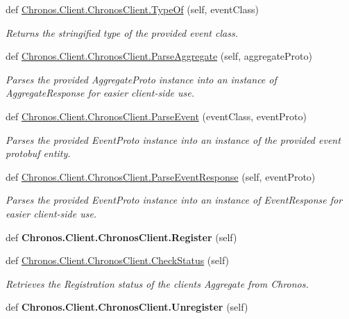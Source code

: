 \begin{DoxyCompactItemize}
\item 
def \hyperlink{group__Chronos_gae5a664ef1c7bf294b17376794264699f}{Chronos.\+Client.\+Chronos\+Client.\+Type\+Of} (self, event\+Class)
\begin{DoxyCompactList}\small\item\em Returns the stringified type of the provided event class. \end{DoxyCompactList}\item 
def \hyperlink{group__Chronos_ga73356a0cabbb65e5ee84927e98e66b18}{Chronos.\+Client.\+Chronos\+Client.\+Parse\+Aggregate} (self, aggregate\+Proto)
\begin{DoxyCompactList}\small\item\em Parses the provided Aggregate\+Proto instance into an instance of Aggregate\+Response for easier client-\/side use. \end{DoxyCompactList}\item 
def \hyperlink{group__Chronos_gafdce0107a1a368f4f4f7e7c9b084fc0c}{Chronos.\+Client.\+Chronos\+Client.\+Parse\+Event} (event\+Class, event\+Proto)
\begin{DoxyCompactList}\small\item\em Parses the provided Event\+Proto instance into an instance of the provided event protobuf entity. \end{DoxyCompactList}\item 
def \hyperlink{group__Chronos_gade70bdac06e41607144ef2a0fb7a3e36}{Chronos.\+Client.\+Chronos\+Client.\+Parse\+Event\+Response} (self, event\+Proto)
\begin{DoxyCompactList}\small\item\em Parses the provided Event\+Proto instance into an instance of Event\+Response for easier client-\/side use. \end{DoxyCompactList}\item 
def {\bfseries Chronos.\+Client.\+Chronos\+Client.\+Register} (self)\hypertarget{group__Chronos_ga095a52584dd2cd474d268ae5e8c8df20}{}\label{group__Chronos_ga095a52584dd2cd474d268ae5e8c8df20}

\item 
def \hyperlink{group__Chronos_ga6cae4fd381b0282b2aa5820b3d0f6266}{Chronos.\+Client.\+Chronos\+Client.\+Check\+Status} (self)
\begin{DoxyCompactList}\small\item\em Retrieves the Registration status of the client\textquotesingle{}s Aggregate from Chronos. \end{DoxyCompactList}\item 
def {\bfseries Chronos.\+Client.\+Chronos\+Client.\+Unregister} (self)\hypertarget{group__Chronos_ga8df2ee74409a55574c86bc01b512c086}{}\label{group__Chronos_ga8df2ee74409a55574c86bc01b512c086}


\end{DoxyCompactItemize}

